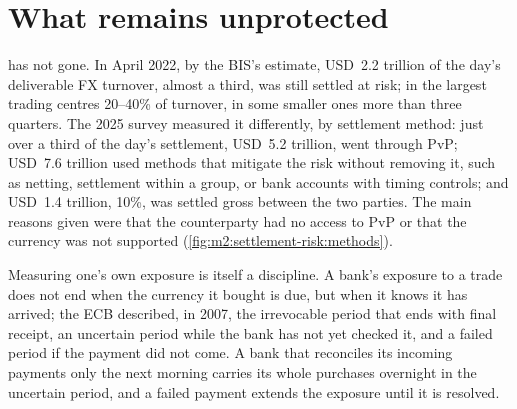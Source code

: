 \section{What remains unprotected}

 has not gone. In April 2022, by the BIS's estimate, USD~2.2 trillion
of the day's deliverable FX turnover, almost a third, was still settled at risk; in
the largest trading centres 20--40\% of turnover, in some smaller ones more than
three quarters. The 2025 survey measured it differently, by settlement method: just
over a third of the day's settlement, USD~5.2 trillion, went through PvP; USD~7.6
trillion used methods that mitigate the risk without removing it, such as netting,
settlement within a group, or bank accounts with timing controls; and USD~1.4
trillion, 10\%, was settled gross between the two parties. The main reasons given
were that the counterparty had no access to PvP or that the currency was not
supported (\cref{fig:m2:settlement-risk:methods}).

\begin{omfigure}

\label{fig:m2:settlement-risk:methods}
\end{omfigure}

Measuring one's own exposure is itself a discipline. A bank's exposure to a trade
does not end when the currency it bought is due, but when it knows it has arrived;
the ECB described, in 2007, the irrevocable period that ends with final receipt, an
uncertain period while the bank has not yet checked it, and a failed period if the
payment did not come. A bank that reconciles its incoming payments only the next
morning carries its whole purchases overnight in the uncertain period, and a failed
payment extends the exposure until it is resolved.

